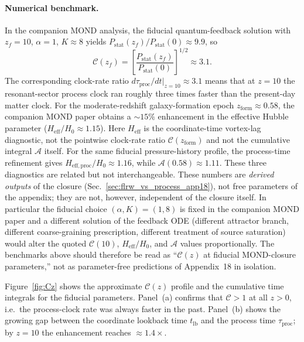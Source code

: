 \documentclass[11pt]{article}
\begin{document}
\paragraph{Numerical benchmark.}
In the companion MOND analysis, the fiducial quantum-feedback
solution with $z_f=10$, $\alpha=1$, $K\approx 8$ yields
$P_{\mathrm{stat}}(z_f)/P_{\mathrm{stat}}(0)\approx 9.9$,
so
\begin{equation}
  \mathcal{C}(z_f)
  = \left[\frac{P_{\mathrm{stat}}(z_f)}{P_{\mathrm{stat}}(0)}\right]^{1/2}
  \approx 3.1.
  \label{eq:Cbench_app18}
\end{equation}
The corresponding clock-rate ratio
$d\tau_{\mathrm{proc}}/dt\big|_{z=10}\approx 3.1$ means that at $z=10$
the resonant-sector process clock ran roughly three times faster than the
present-day matter clock.  For the moderate-redshift galaxy-formation epoch
$z_{\mathrm{form}}\approx 0.58$, the companion MOND paper obtains a
$\sim\!15\%$ enhancement in the effective Hubble parameter
($H_{\mathrm{eff}}/H_0\approx 1.15$).
Here $H_{\mathrm{eff}}$ is the coordinate-time vortex-lag diagnostic,
not the pointwise clock-rate ratio $\mathcal{C}(z_{\mathrm{form}})$
and not the cumulative integral $\mathcal{A}$ itself.  For the same
fiducial pressure-history profile, the process-time refinement gives
$H_{\mathrm{eff,proc}}/H_0\approx 1.16$, while
$\mathcal{A}(0.58)\approx 1.11$.  These three diagnostics are related
but not interchangeable.
These numbers are \emph{derived outputs} of the closure
(Sec.~\ref{sec:flrw_vs_process_app18}), not free parameters of the
appendix; they are not, however, independent of the closure itself.
In particular the fiducial choice $(\alpha,K)=(1,8)$ is fixed in the
companion MOND paper and a different solution of the feedback ODE
(different attractor branch, different coarse-graining prescription,
different treatment of source saturation) would alter the quoted
$\mathcal{C}(10)$, $H_{\mathrm{eff}}/H_0$, and $\mathcal{A}$ values
proportionally.  The benchmarks above should therefore be read as
``$\mathcal{C}(z)$ at fiducial MOND-closure parameters,'' not as
parameter-free predictions of Appendix~18 in isolation.

Figure~\ref{fig:Cz} shows the approximate $\mathcal{C}(z)$ profile and the
cumulative time integrals for the fiducial parameters.  Panel~(a)
confirms that $\mathcal{C}>1$ at all $z>0$, i.e.\ the process-clock
rate was always faster in the past.  Panel~(b) shows the growing
gap between the coordinate lookback time $t_{\mathrm{lb}}$ and the
process time $\tau_{\mathrm{proc}}$; by $z=10$ the enhancement
reaches $\approx 1.4\times$.
\end{document}
